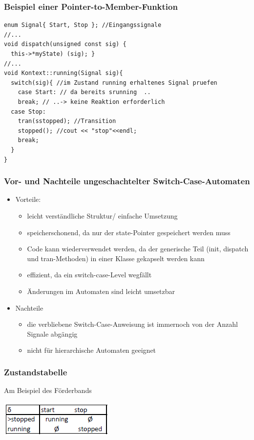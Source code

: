 \documentclass{beamer}
\begin{document}
\begin{frame}[fragile]
  \frametitle{Beispiel einer Pointer-to-Member-Funktion}
  \begin{lstlisting}
enum Signal{ Start, Stop }; //Eingangssignale
//...
void dispatch(unsigned const sig) {
  this->*myState) (sig); } 
//...
void Kontext::running(Signal sig){
  switch(sig){ //im Zustand running erhaltenes Signal pruefen
    case Start: // da bereits srunning  ..
    break; // ..-> keine Reaktion erforderlich
  case Stop:
    tran(sstopped); //Transition
    stopped(); //cout << "stop"<<endl;
    break;
  }
}  
  \end{lstlisting}
\end{frame}

\begin{frame}
  \frametitle{Vor- und Nachteile ungeschachtelter Switch-Case-Automaten}
  \begin{itemize}
    \item Vorteile:
    \begin{itemize}
      \item leicht verst\"andliche Struktur/ einfache Umsetzung
      \item speicherschonend, da nur der state-Pointer gespeichert werden muss
      \item Code kann wiederverwendet werden, da der generische Teil (init, dispatch und tran-Methoden) in einer Klasse gekapselt werden kann
      \item effizient, da ein switch-case-Level wegf\"allt
      \item \"Anderungen im Automaten sind leicht umsetzbar
    \end{itemize}
    \item Nachteile
    \begin{itemize}
      \item die verbliebene Switch-Case-Anweisung ist immernoch von der Anzahl Signale abg\"angig
      \item nicht f\"ur hierarchische Automaten geeignet
    \end{itemize}
  \end{itemize}
\end{frame}

\begin{frame}
 \frametitle{Zustandstabelle}
 Am Beispiel des F\"orderbands
 \newline
 \begin{center}
 \includegraphics{img/zustandstabelle.PNG}
 \end{center}
\end{frame}
\end{document}

